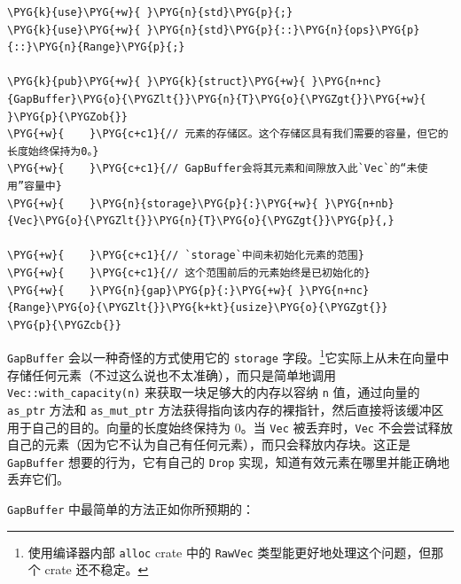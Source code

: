 \begin{Verbatim}[commandchars=\\\{\},breaklines=true,breakanywhere=true,fontsize=\codefont,xleftmargin=17bp]
\PYG{k}{use}\PYG{+w}{ }\PYG{n}{std}\PYG{p}{;}
\PYG{k}{use}\PYG{+w}{ }\PYG{n}{std}\PYG{p}{::}\PYG{n}{ops}\PYG{p}{::}\PYG{n}{Range}\PYG{p}{;}

\PYG{k}{pub}\PYG{+w}{ }\PYG{k}{struct}\PYG{+w}{ }\PYG{n+nc}{GapBuffer}\PYG{o}{\PYGZlt{}}\PYG{n}{T}\PYG{o}{\PYGZgt{}}\PYG{+w}{ }\PYG{p}{\PYGZob{}}
\PYG{+w}{    }\PYG{c+c1}{// 元素的存储区。这个存储区具有我们需要的容量，但它的长度始终保持为0。}
\PYG{+w}{    }\PYG{c+c1}{// GapBuffer会将其元素和间隙放入此`Vec`的“未使用”容量中}
\PYG{+w}{    }\PYG{n}{storage}\PYG{p}{:}\PYG{+w}{ }\PYG{n+nb}{Vec}\PYG{o}{\PYGZlt{}}\PYG{n}{T}\PYG{o}{\PYGZgt{}}\PYG{p}{,}

\PYG{+w}{    }\PYG{c+c1}{// `storage`中间未初始化元素的范围}
\PYG{+w}{    }\PYG{c+c1}{// 这个范围前后的元素始终是已初始化的}
\PYG{+w}{    }\PYG{n}{gap}\PYG{p}{:}\PYG{+w}{ }\PYG{n+nc}{Range}\PYG{o}{\PYGZlt{}}\PYG{k+kt}{usize}\PYG{o}{\PYGZgt{}}
\PYG{p}{\PYGZcb{}}
\end{Verbatim}

\texttt{GapBuffer} 会以一种奇怪的方式使用它的 \texttt{storage} 字段。\footnote{使用编译器内部 \texttt{alloc} crate 中的 \texttt{RawVec} 类型能更好地处理这个问题，但那个 crate 还不稳定。}它实际上从未在向量中存储任何元素（不过这么说也不太准确），而只是简单地调用 \texttt{Vec::with\_capacity(n)} 来获取一块足够大的内存以容纳 \texttt{n} 值，通过向量的 \texttt{as\_ptr} 方法和 \texttt{as\_mut\_ptr} 方法获得指向该内存的裸指针，然后直接将该缓冲区用于自己的目的。向量的长度始终保持为 0。当 \texttt{Vec} 被丢弃时，\texttt{Vec} 不会尝试释放自己的元素（因为它不认为自己有任何元素），而只会释放内存块。这正是 \texttt{GapBuffer} 想要的行为，它有自己的 \texttt{Drop} 实现，知道有效元素在哪里并能正确地丢弃它们。

\texttt{GapBuffer} 中最简单的方法正如你所预期的：

